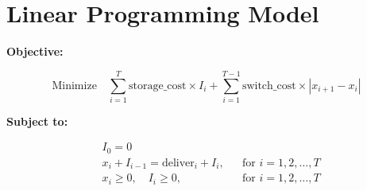 \documentclass{article}
\begin{document}
\section*{Linear Programming Model}

\textbf{Objective:}

\[
\text{Minimize} \quad \sum_{i=1}^{T} \text{storage\_cost} \times I_i + \sum_{i=1}^{T-1} \text{switch\_cost} \times |x_{i+1} - x_i| 
\]

\textbf{Subject to:}

\begin{align*}
& I_0 = 0 \\
& x_i + I_{i-1} = \text{deliver}_i + I_i, && \text{for } i = 1, 2, \ldots, T \\
& x_i \geq 0, \quad I_i \geq 0, && \text{for } i = 1, 2, \ldots, T
\end{align*}
\end{document}
